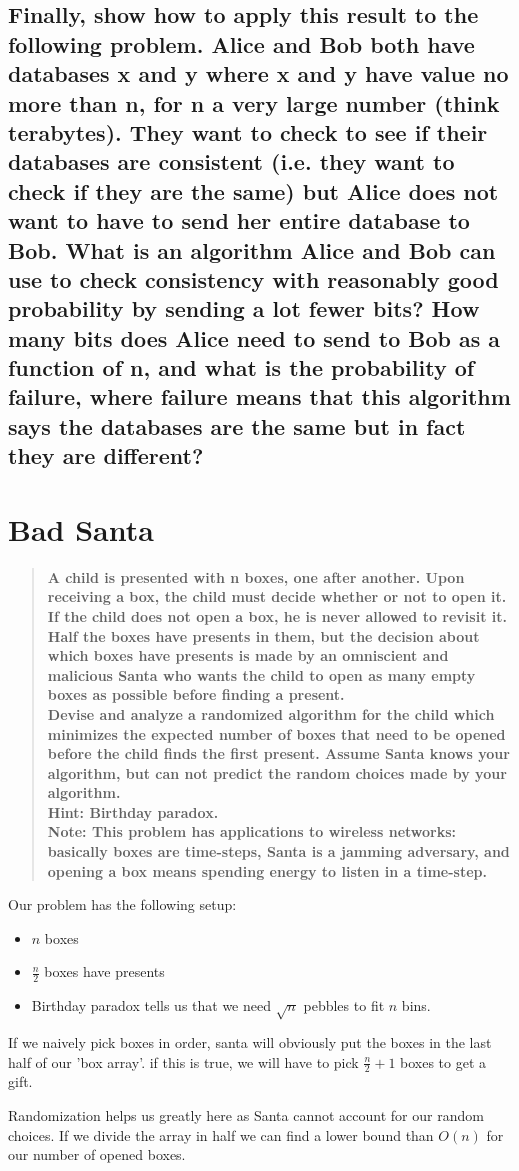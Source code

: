 \documentclass[titlepage]{article}\usepackage[]{graphicx}\usepackage[]{color}
\begin{document}
\subsection{ Finally, show how to apply this result to the following problem. Alice and
Bob both have databases x and y where x and y have value no more than n, for n
a very large number (think terabytes). They want to check to see if their
databases are consistent (i.e. they want to check if they are the same) but
Alice does not want to have to send her entire database to Bob. What is an
algorithm Alice and Bob can use to check consistency with reasonably good
probability by sending a lot fewer bits? How many bits does Alice need to send
to Bob as a function of n, and what is the probability of failure, where
failure means that this algorithm says the databases are the same but in fact
they are different? }


\section{Bad Santa }
\begin{quote}
	\textbf{
		A child is presented with n boxes, one after another. Upon receiving
		a box, the child must decide whether or not to open it. If the child does not
		open a box, he is never allowed to revisit it. Half the
		boxes have presents in them, but the decision about which boxes have presents
		is made by an omniscient and malicious Santa who wants the child to open as
		many empty boxes as possible before finding a present. \\ 
		Devise and analyze a randomized algorithm for the child which minimizes the
		expected number of boxes that need to be opened before the child finds the
		first present. Assume Santa knows your algorithm, but can not predict the
		random choices made by your algorithm. \\ 
		Hint: Birthday paradox. \\
		Note: This problem has applications to wireless networks: basically boxes are
		time-steps, Santa is a jamming adversary, and opening a box means spending
	energy to listen in a time-step.}
\end{quote}

Our problem has the following setup:

\begin{itemize}
	\item $n$ boxes
	\item $\frac{n}{2}$ boxes have presents
	\item Birthday paradox tells us that we need $\sqrt{n}$ pebbles to fit
		$n$ bins. 
\end{itemize}

If we naively pick boxes in order, santa will obviously put the boxes in the
last half of our 'box array'. if this is true, we will have to pick
$\frac{n}{2} + 1$ boxes to get a gift. 

Randomization helps us greatly here as Santa cannot account for our random
choices. If we divide the array in half we can find a lower bound than $O(n)$
for our number of opened boxes. 
\end{document}
